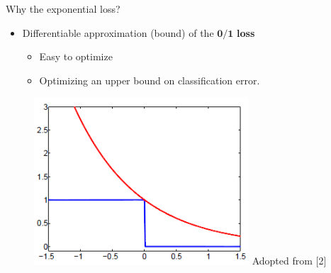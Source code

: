 \documentclass[serif, aspectratio=169]{beamer}
\begin{document}
\begin{frame}{Why the exponential loss?}
    \begin{itemize}
        \itemsep1em
        \justifying
        \item Differentiable approximation (bound) of the $\boldsymbol{0/1}$ \textbf{loss}
        \begin{itemize}
            \item Easy to optimize
            \item Optimizing an upper bound on classification error.
        \end{itemize}
    \end{itemize}
    \endminipage
    \hfill
    \begin{figure}
        \includegraphics[width=\textwidth]{pic/exploss.png}
        {\scriptsize Adopted from [2]}
    \end{figure}
    \endminipage
\end{frame}
\end{document}
